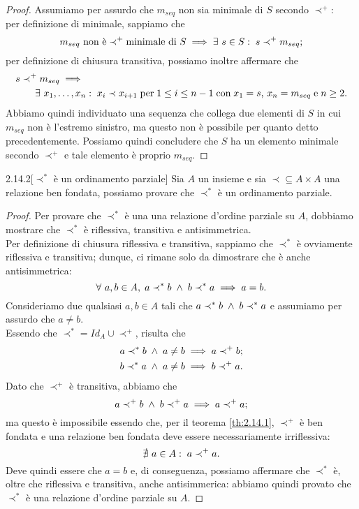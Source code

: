 \begin{proof}
Assumiamo per assurdo che $m_{seq}$ non sia minimale di $S$ secondo $\prec^+$:\\
per definizione di minimale, sappiamo che \[
	m_{seq} \ \text{non è} \prec^+ \text{minimale di}\ S
	\implies \exists\ s \in S :\; s \prec^+ m_{seq};
\]
per definizione di chiusura transitiva, possiamo inoltre affermare che
\begin{align*}
	& s \prec^+ m_{seq} \implies \\ 
	& \hspace{2em} \exists \ x_1, \ldots, x_n :\; x_i \prec x_{i+1} \; \text{per} \; 1 \leq i \leq n-1 
	  	   \; \text{con} \; x_1 = s \text{,} \ x_n = m_{seq} \; \text{e} \; n \geq 2.
\end{align*}
Abbiamo quindi individuato una sequenza che collega due elementi di $S$ in cui $m_{seq}$ non è l'estremo sinistro, ma questo non è possibile per quanto detto precedentemente. Possiamo quindi concludere che $S$ ha un elemento minimale secondo $\prec^+$ e tale elemento è proprio $m_{seq}$.
\end{proof}

\begin{customthm}{2.14.2}[$\prec^*$ è un ordinamento parziale]
\label{th:2.14.2}
Sia $A$ un insieme e sia ${\prec} \subseteq {A \times A}$ una relazione ben fondata, possiamo provare che $\prec^*$ è un ordinamento parziale.
\end{customthm}
\begin{proof}
Per provare che $\prec^*$ è una una relazione d'ordine parziale su $A$, dobbiamo mostrare che $\prec^*$ è riflessiva, transitiva e antisimmetrica.\\
Per definizione di chiusura riflessiva e transitiva, sappiamo che $\prec^*$ è ovviamente riflessiva e transitiva; dunque, ci rimane solo da dimostrare che è anche antisimmetrica: \[
	\forall\ a,b \in A ,\;
		a \prec^* b \; \land \; b \prec^* a
		\implies a = b.
\]
Consideriamo due qualsiasi $a,b \in A$ tali che $a \prec^* b \; \land \; b \prec^* a$ e assumiamo per assurdo che  $a \neq b$.\\
Essendo che $\prec^* = Id_A \cup \prec^+$, risulta che 
\begin{align*}
	& a \prec^* b \; \land \; a \neq b \implies a \prec^+ b; \\
	& b \prec^* a \; \land \; a \neq b \implies b \prec^+ a.
\end{align*}
Dato che $\prec^+$ è transitiva, abbiamo che \[
	a \prec^+ b \; \land \; b \prec^+ a \implies a \prec^+ a;
\]
ma questo è impossibile essendo che, per il teorema \ref{th:2.14.1}, $\prec^+$ è ben fondata e una relazione ben fondata deve essere necessariamente irriflessiva: \[
	\nexists\ a \in A :\; a \prec^+ a.
\]
Deve quindi essere che $a=b$ e, di conseguenza, possiamo affermare che $\prec^*$ è, oltre che riflessiva e transitiva, anche antisimmerica: abbiamo quindi provato che $\prec^*$ è una relazione d'ordine parziale su $A$.
\end{proof}

